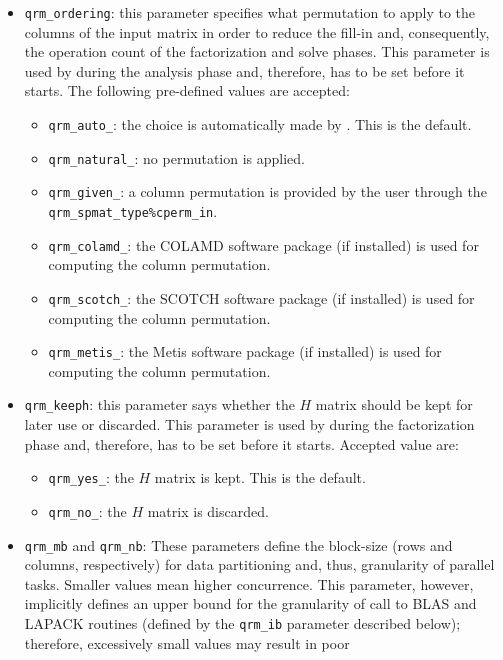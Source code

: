 \documentclass[11pt]{article}
\begin{document}
\begin{itemize}
\item \texttt{qrm\_ordering}: this parameter specifies what
  permutation to apply to the columns of the input matrix in order to
  reduce the fill-in and, consequently, the operation count of the
  factorization and solve phases. This parameter is used by \qrm
  during the analysis phase and, therefore, has to be set before it
  starts. The following pre-defined values are
  accepted:
  \begin{itemize}
  \item \texttt{qrm\_auto\_}: the choice is automatically made by
    \qrm. This is the default.
  \item \texttt{qrm\_natural\_}: no permutation is applied.
  \item \texttt{qrm\_given\_}: a column permutation is provided by the
    user through the \texttt{qrm\_spmat\_type\%cperm\_in}.
  \item \texttt{qrm\_colamd\_}: the COLAMD software package (if
    installed) is used for computing the column permutation.
  \item \texttt{qrm\_scotch\_}: the SCOTCH software package (if
    installed) is used for computing the column permutation.
  \item \texttt{qrm\_metis\_}: the Metis software package (if
    installed) is used for computing the column permutation.
  \end{itemize}
\item \texttt{qrm\_keeph}: this parameter says whether the $H$ matrix
  should be kept for later use or discarded. This parameter is used by \qrm
  during the factorization phase and, therefore, has to be set before it
  starts. Accepted value are:
  \begin{itemize}
  \item \texttt{qrm\_yes\_}: the $H$ matrix is kept. This is the default.
  \item \texttt{qrm\_no\_}: the $H$ matrix is discarded.
  \end{itemize}
\item \texttt{qrm\_mb} and \texttt{qrm\_nb}: These parameters define
  the block-size (rows and columns, respectively) for data
  partitioning and, thus, granularity of parallel tasks. Smaller
  values mean higher concurrence. This parameter, however, implicitly
  defines an upper bound for the granularity of call to BLAS and
  LAPACK routines (defined by the \texttt{qrm\_ib} parameter described
  below); therefore, excessively small values may result in poor

\end{itemize}
\end{document}
